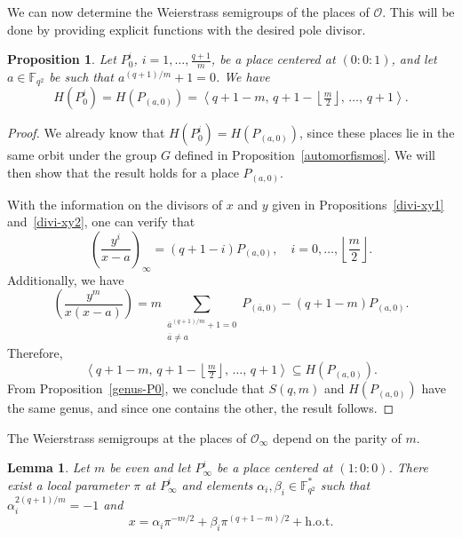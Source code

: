 \documentclass[12pt]{amsart}
\newtheorem{lemma}[theorem]{Lemma}
\newtheorem{proposition}[theorem]{Proposition}
\theoremstyle{remark}
\theoremstyle{definition}
\begin{document}
We can now determine the Weierstrass semigroups of the places of $\mathcal{O}$.
This will be done by providing explicit functions with the desired pole divisor.

\begin{proposition}\label{prop:num-zeros}
    Let $P_0^i$, $i=1,\ldots,\frac{q+1}{m}$, be a place centered at $(0:0:1)$,
    and let $a\in\mathbb{F}_{q^2}$ be such that $a^{(q+1)/m}+1=0$. We have
    $$H(P_0^i) = H(P_{(a,0)}) =
      \left\langle q+1-m,\, q+1-\left\lfloor\tfrac{m}{2}\right\rfloor,\,
      \ldots,\, q+1 \right\rangle.$$
\end{proposition}

\begin{proof}
    We already know that $H(P_0^i) = H(P_{(a,0)})$, since these places lie in
    the same orbit under the group $G$ defined in
    Proposition~\ref{automorfismos}. We will then show that the result holds
    for a place $P_{(a,0)}$.

    With the information on the divisors of $x$ and $y$ given in
    Propositions~\ref{divi-xy1} and~\ref{divi-xy2}, one can verify that
    $$\left(\frac{y^i}{x-a}\right)_{\infty} = (q+1-i)P_{(a,0)},
      \quad i=0, \ldots, \left\lfloor \frac{m}{2} \right\rfloor.$$
    Additionally, we have
    $$\left(\frac{y^m}{x(x-a)}\right) =
      m\sum_{\substack{\overline{a}^{(q+1)/m}+1 = 0 \\ \overline{a} \neq a}}
      P_{(\overline{a},0)} - (q+1-m)P_{(a,0)}.$$
    Therefore,
    $$\left\langle q+1-m,\, q+1-\left\lfloor\tfrac{m}{2}\right\rfloor,\,
      \ldots,\, q+1 \right\rangle \subseteq H(P_{(a,0)}).$$
    From Proposition~\ref{genus-P0}, we conclude that $S(q,m)$ and
    $H(P_{(a,0)})$ have the same genus, and since one contains the other,
    the result follows.
\end{proof}
The Weierstrass semigroups at the places of $\mathcal{O}_{\infty}$ depend on
the parity of $m$.

\begin{lemma}\label{Pinf-m-even}
    Let $m$ be even and let $P_{\infty}^i$ be a place centered at $(1:0:0)$.
    There exist a local parameter $\pi$ at $P_{\infty}^i$ and elements
    $\alpha_i, \beta_i \in \mathbb{F}_{q^2}^*$ such that
    $\alpha_i^{2(q+1)/m} = -1$ and
    $$x = \alpha_i \pi^{-m/2} + \beta_i \pi^{(q+1-m)/2} + \mathrm{h.o.t.}$$
\end{lemma}
\end{document}
